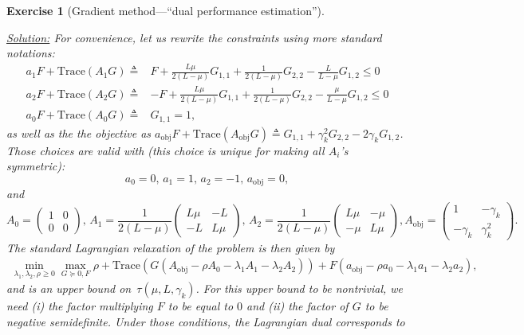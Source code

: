 \documentclass[11pt,a4paper]{article}
\newcommand{\correction}[1]{{{\color{blue}\underline{Solution:} #1}}}
\newcommand{\correction}[1]{}
\newtheorem{exercise}{Exercise}
\begin{document}
\begin{exercise}[Gradient method---``dual performance estimation'']
\begin{enumerate}
		\correction{For convenience, let us rewrite the constraints using more standard notations:
	\begin{equation*}
			\begin{aligned}
			a_1 F+\mathrm{Trace}(A_1 G)\triangleq& F + \tfrac{L\mu}{2(L-\mu)} G_{1,1}+\tfrac{1}{2(L-\mu)}G_{2,2}-\tfrac{L}{L-\mu}G_{1,2}\leqslant 0\\
			a_2 F+\mathrm{Trace}(A_2 G)\triangleq&-F + \tfrac{L\mu}{2(L-\mu)} G_{1,1}+\tfrac{1}{2(L-\mu)}G_{2,2}-\tfrac{\mu}{L-\mu}G_{1,2}\leqslant 0\\
			a_0F+\mathrm{Trace}(A_0 G)\triangleq&G_{1,1}= 1,
			\end{aligned}
	\end{equation*}
	as well as the the objective as $a_{\text{obj}}F+\mathrm{Trace}(A_{\text{obj}}G)\triangleq G_{1,1}+\gamma_k ^2 G_{2,2}-2\gamma_k G_{1,2}$. Those choices are valid with (this choice is unique for making all $A_i$'s symmetric):
	\[ a_0=0,\,a_1=1,\,a_2=-1,\,a_{\text{obj}}=0, \]
	and 
	\[
	A_0=\begin{pmatrix}
	1 & 0 \\ 0 & 0
	\end{pmatrix},\,
	A_1=\frac{1}{2(L-\mu)}\begin{pmatrix}
	L\mu & -L \\ -L & L\mu
	\end{pmatrix},\,
	A_2=\frac{1}{2(L-\mu)}\begin{pmatrix}
	L\mu & -\mu \\ -\mu & L\mu
	\end{pmatrix},
	A_{\text{obj}}=\begin{pmatrix}
	1 & -\gamma_k\\ -\gamma_k & \gamma_k^2
	\end{pmatrix}.\]
	The standard Lagrangian relaxation of the problem is then given by
	\begin{equation}
	\begin{aligned}
	\min_{\lambda_1,\lambda_2,\rho\geqslant 0}\max_{G\succeq 0,F} \rho+\mathrm{Trace}\left(G (A_{\text{obj}}-\rho A_0-\lambda_1 A_1-\lambda_2 A_2)\right)+F(a_{\text{obj}}-\rho a_0-\lambda_1a_1-\lambda_2 a_2),
	\end{aligned}
	\end{equation}		
	and is an upper bound on~$\tau(\mu,L,\gamma_k)$. For this upper bound to be nontrivial, we need (i) the factor multiplying $F$ to be equal to $0$ and (ii) the factor of $G$ to be negative semidefinite. Under those conditions, the Lagrangian dual corresponds to
	\begin{equation}\label{ex2:eq:dual_formulation_from_Lagrangian}

\end{equation}}
\end{enumerate}
\end{exercise}
\end{document}
